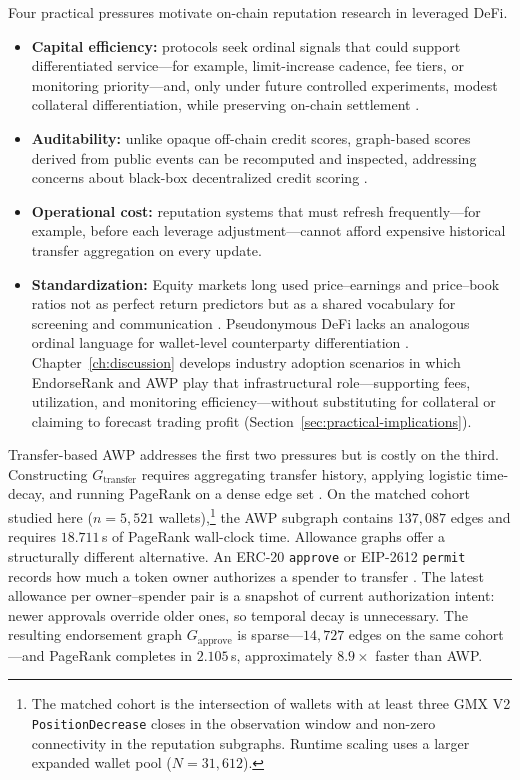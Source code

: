 Four practical pressures motivate on-chain reputation research in leveraged DeFi.
\begin{itemize}
\item \textbf{Capital efficiency:} protocols seek ordinal signals that could support differentiated service---for example, limit-increase cadence, fee tiers, or monitoring priority---and, only under future controlled experiments, modest collateral differentiation, while preserving on-chain settlement .
\item \textbf{Auditability:} unlike opaque off-chain credit scores, graph-based scores derived from public events can be recomputed and inspected, addressing concerns about black-box decentralized credit scoring .
\item \textbf{Operational cost:} reputation systems that must refresh frequently---for example, before each leverage adjustment---cannot afford expensive historical transfer aggregation on every update.
\item \textbf{Standardization:} Equity markets long used price--earnings and price--book ratios not as perfect return predictors but as a shared vocabulary for screening and communication . Pseudonymous DeFi lacks an analogous ordinal language for wallet-level counterparty differentiation . Chapter~\ref{ch:discussion} develops industry adoption scenarios in which EndorseRank and AWP play that infrastructural role---supporting fees, utilization, and monitoring efficiency---without substituting for collateral or claiming to forecast trading profit (Section~\ref{sec:practical-implications}).
\end{itemize}

Transfer-based AWP addresses the first two pressures but is costly on the third. Constructing $G_{\text{transfer}}$ requires aggregating transfer history, applying logistic time-decay, and running PageRank on a dense edge set . On the matched cohort studied here ($n=5{,}521$ wallets),\footnote{The matched cohort is the intersection of wallets with at least three GMX V2 \texttt{PositionDecrease} closes in the observation window and non-zero connectivity in the reputation subgraphs. Runtime scaling uses a larger expanded wallet pool ($N=31{,}612$).} the AWP subgraph contains $137{,}087$ edges and requires $18.711$\,s of PageRank wall-clock time. Allowance graphs offer a structurally different alternative. An ERC-20 \texttt{approve} or EIP-2612 \texttt{permit} records how much a token owner authorizes a spender to transfer . The latest allowance per owner--spender pair is a snapshot of current authorization intent: newer approvals override older ones, so temporal decay is unnecessary. The resulting endorsement graph $G_{\text{approve}}$ is sparse---$14{,}727$ edges on the same cohort---and PageRank completes in $2.105$\,s, approximately $8.9\times$ faster than AWP.

